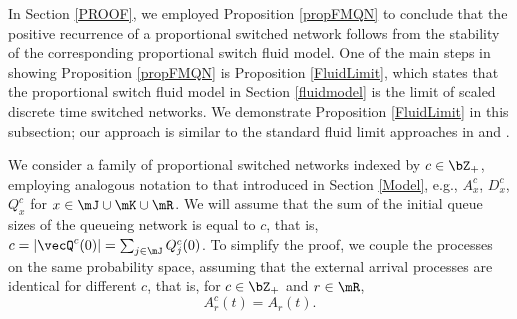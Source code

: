 \documentclass{amsart}
\begin{document}
\iffalse
We define the processes $A_k(t)$ also for $t\leq0$ such that $Q_k(0)=A_k(0)$.
For the discrete and the continuous model the following equations hold
\begin{align}
D_j(t) &= \sum_{s=0}^t \sigma_j(\vecQ(s)) \label{eq:sigmaj}\\
D_j(t) &= \int_0^t \sigma_j(\vecQ(s)) \, ds \label{eq:cont.sigmaj} \ .
\end{align}
For the discrete time process, for $t > 0$
\begin{equation}\label{eq.arr.disc.time}
A_r(t+1)-A_r(t) \quad  r\in\mR
\end{equation}
are i.i.d. random variables with mean $a_r$, while for  the continuous fluid model and $t>0$
\begin{equation}\label{eq.fluid.model}
A_r(t) - A_r(0) = a_r \, t \quad r\in\mR \ .
\end{equation}
Let $\invA_j(\cdot)$ be the inverse function of $A_j(\cdot)$ that is
\begin{equation}
\invA_j(A_j(t))=\inf\{s:A(s)\geq t\}
\end{equation}
such that $A_j(\invA_j(s))=s$.
Notice, in the second equality that we do not allow for impulsive arrivals.
We have that
\begin{equation}
\Gamma_k(s) = A_k(\invA_j(s))
\end{equation}
For the discrete time model
\begin{equation}
\gamma_k(s) = \Gamma_k(s+1) - \Gamma_k(s) 
\end{equation}
and in the continuos time model
\begin{equation}
\gamma_k(s) = \Gamma'_k(s)  
\end{equation}
\fi

In Section \ref{PROOF}, we employed Proposition \ref{propFMQN} to conclude that
the positive recurrence of a proportional switched network follows from the stability
of the corresponding proportional switch fluid model.  
One of the main steps in showing Proposition \ref{propFMQN} 
is Proposition \ref{FluidLimit}, which states that
the proportional switch fluid model in Section \ref{fluidmodel} is the limit of scaled discrete time switched networks.
We demonstrate  Proposition \ref{FluidLimit} in this subsection; our approach is similar to the standard fluid limit approaches in \cite{Da95} and \cite{Br08}. 

 We consider a family of proportional switched networks indexed by $c\in\bZ_+$, employing
analogous notation 
to that introduced in Section \ref{Model}, e.g., $A^c_x$, $D^c_x$, $Q^c_x$ for $x\in \mJ \cup \mK \cup \mR$.  We will assume that the sum of the initial queue sizes of the queueing network is equal
to $c$, that is,
$c=|\vecQ^c(0)| = \sum_{j\in\mJ} Q^c_j(0)$.
To simplify the proof, we couple the processes on the same probability space, assuming that the external arrival processes are identical for different $c$, that is, for $c\in\bZ_+$ and $r\in\mR$,
\begin{equation*}
 A^c_r(t) =  A_r(t).
\end{equation*}
 
\end{document}
